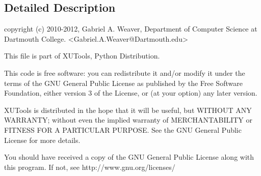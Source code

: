 \subsection{Detailed Description}
\begin{DoxyVerb}copyright (c) 2010-2012, Gabriel A. Weaver, Department of Computer
Science at Dartmouth College. <Gabriel.A.Weaver@Dartmouth.edu>

This file is part of XUTools, Python Distribution.

This code is free software:  you can redistribute                
it and/or modify it under the terms of the GNU General Public                   
License as published by the Free Software Foundation, either version            
3 of the License, or (at your option) any later version.                        
                                                                                
XUTools is distributed in the hope that it will be useful, but WITHOUT
ANY WARRANTY; without even the implied warranty of MERCHANTABILITY or
FITNESS FOR A PARTICULAR PURPOSE.  See the GNU General Public License
for more details.
                                                                                
You should have received a copy of the GNU General Public License               
along with this program.  If not, see http://www.gnu.org/licenses/
\end{DoxyVerb}
 